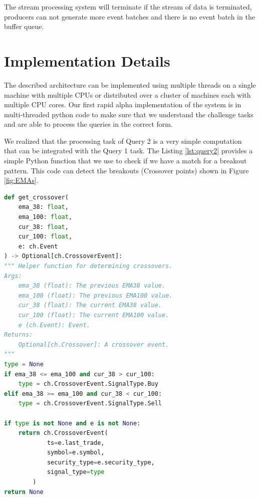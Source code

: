 The stream processing system will terminate if the stream of data is terminated, producers can not generate more event batches
and there is no event batch in the buffer queue.





\section{Implementation Details}\label{sec:implementation}
The described architecture can be implemented using multiple threads on a single machine with multiple CPUs or distributed over a cluster of machines each with multiple CPU cores. Our first rapid alpha implementation of the system is in multi-threaded python code to make sure that we understand the challenge tasks and are able to process the queries in the correct form.


We realized that the processing task of Query 2 is a very simple computation that can be integrated with the Query 1 task.
The Listing \ref{lst:query2} provides a simple Python function that we use to check if we have a match for a breakout pattern.
This code can detect the breakouts (Crossover points) shown in Figure \ref{fig:EMAs}.




\begin{minipage}{0.9\linewidth}
\begin{lstlisting}[caption={The computation for Query 2 - Breakout Patterns of EMA38 and EMA100}, label={lst:query2},language=Python]
def get_crossover(
    ema_38: float,
    ema_100: float,
    cur_38: float,
    cur_100: float,
    e: ch.Event
) -> Optional[ch.CrossoverEvent]:
""" Helper function for determining crossovers.
Args:
    ema_38 (float): The previous EMA38 value.
    ema_100 (float): The previous EMA100 value.
    cur_38 (float): The current EMA38 value.
    cur_100 (float): The current EMA100 value.
    e (ch.Event): Event.
Returns:
    Optional[ch.Crossover]: A crossover event.
"""
type = None
if ema_38 <= ema_100 and cur_38 > cur_100:
    type = ch.CrossoverEvent.SignalType.Buy
elif ema_38 >= ema_100 and cur_38 < cur_100:
    type = ch.CrossoverEvent.SignalType.Sell

if type is not None and e is not None:
    return ch.CrossoverEvent(
            ts=e.last_trade,
            symbol=e.symbol,
            security_type=e.security_type,
            signal_type=type
        )
return None
\end{lstlisting}
\end{minipage}





